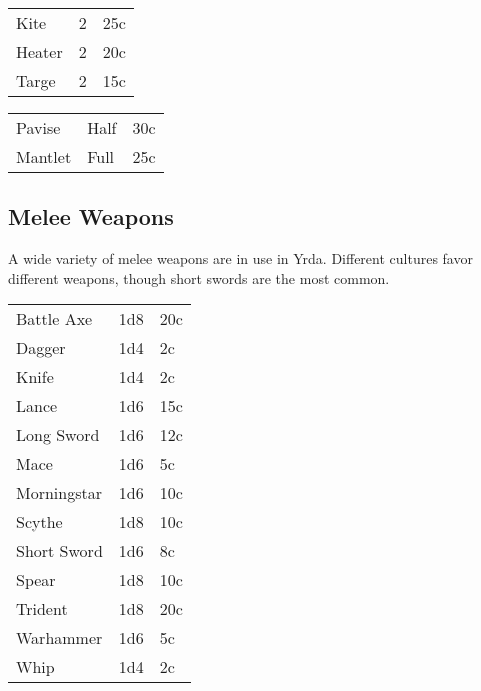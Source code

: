 \begin{center}
{
\begin{xtabular}{|l|l|l|}
Kite & 2 & 25c \\
Heater & 2 & 20c \\
Targe & 2 & 15c \\
\hline
\end{xtabular}
}
\end{center}

\begin{center}
{
\begin{xtabular}{|l|l|l|}
Pavise & Half & 30c \\
Mantlet & Full & 25c \\
\hline
\end{xtabular}
}
\end{center}

\subsection{Melee Weapons}

A wide variety of melee weapons are in use in Yrda. Different
cultures favor different weapons, though short swords are the
most common.

\begin{center}
{
\begin{xtabular}{|l|l|l|}
Battle Axe & 1d8 & 20c \\
Dagger & 1d4 & 2c \\
Knife & 1d4 & 2c \\
Lance & 1d6 & 15c \\
Long Sword & 1d6 & 12c \\
Mace & 1d6 & 5c \\
Morningstar & 1d6 & 10c \\
Scythe & 1d8 & 10c \\
Short Sword & 1d6 & 8c \\
Spear & 1d8 & 10c \\
Trident & 1d8 & 20c \\
Warhammer & 1d6 & 5c \\
Whip & 1d4 & 2c \\
\hline
\end{xtabular}
}
\end{center}

